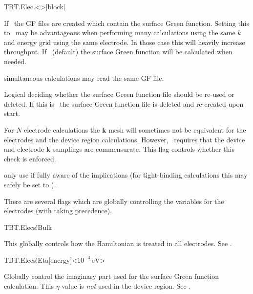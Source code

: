 \begin{fdfentry}{TBT.Elec.<>}[block]
\begin{fdfoptions}
    If \fdftrue\ the GF files are created which contain the surface
    Green function. Setting this to \fdftrue\ may be advantageous when
    performing many calculations using the same $k$ and energy grid
    using the same electrode. In those case this will heavily increase
    throughput. 
    If \fdffalse\ (default) the surface Green function will be
    calculated when needed. 

    \note simultaneous calculations may read the same GF file.

    Logical deciding whether the surface Green function file should be
    re-used or deleted.
    If this is \fdffalse\ the surface Green function file is deleted
    and re-created upon start.

    For $N$ electrode calculations the $\mathbf k$ mesh will sometimes
    not be equivalent for the electrodes and the device region
    calculations. However, \tbtrans\ requires that the device and
    electrode $\mathbf k$ samplings are commensurate. This flag
    controls whether this check is enforced. 

    \note only use if fully aware of the implications (for
    tight-binding calculations this may safely be set to \fdffalse).

  \end{fdfoptions}
  
\end{fdfentry}

There are several flags which are globally controlling the variables
for the electrodes (with  taking precedence).

\begin{fdflogicalT}{TBT.Elecs!Bulk}

  This globally controls how the Hamiltonian is treated in all
  electrodes. 
  See .
  
\end{fdflogicalT}

\begin{fdfentry}{TBT.Elecs!Eta}[energy]<$10^{-4}\,\mathrm{eV}$>
  
  Globally control the imaginary part used for the surface Green
  function calculation. This $\eta$ value is \emph{not} used in the
  device region.
  See .
  
\end{fdfentry}

